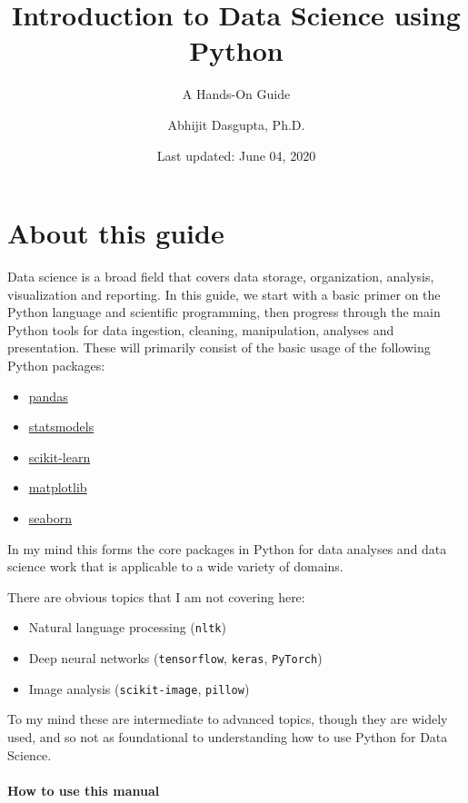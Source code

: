 \documentclass[
  letterpaper,
]{scrbook}
\title{Introduction to Data Science using Python}
\subtitle{A Hands-On Guide}
\author{Abhijit Dasgupta, Ph.D.}
\date{Last updated: June 04, 2020}
\providecommand{\tightlist}{%
  \setlength{\itemsep}{0pt}\setlength{\parskip}{0pt}}
\begin{document}
\maketitle

{
\setcounter{tocdepth}{1}
\tableofcontents
}
\hypertarget{about-this-guide}{%
\chapter{About this guide}\label{about-this-guide}}

Data science is a broad field that covers data storage, organization, analysis, visualization and reporting. In this guide, we start with a basic primer on the Python language and scientific programming, then progress through the main Python tools for data ingestion, cleaning, manipulation, analyses and presentation. These will primarily consist of the basic usage of the following Python packages:

\begin{itemize}
\tightlist
\item
  \href{https://pandas.pydata.org}{pandas}
\item
  \href{https://www.statsmodels.org}{statsmodels}
\item
  \href{https://scikit-learn.org}{scikit-learn}
\item
  \href{https://matplotlib.org}{matplotlib}
\item
  \href{https://seaborn.pydata.org}{seaborn}
\end{itemize}

In my mind this forms the core packages in Python for data analyses and data science work that is applicable to a wide variety of domains.

There are obvious topics that I am not covering here:

\begin{itemize}
\tightlist
\item
  Natural language processing (\texttt{nltk})
\item
  Deep neural networks (\texttt{tensorflow}, \texttt{keras}, \texttt{PyTorch})
\item
  Image analysis (\texttt{scikit-image}, \texttt{pillow})
\end{itemize}

To my mind these are intermediate to advanced topics, though they are widely used, and so not as foundational to understanding how to use Python for Data Science.

\hypertarget{how-to-use-this-manual}{%
\subsubsection*{How to use this manual}\label{how-to-use-this-manual}}
\end{document}
